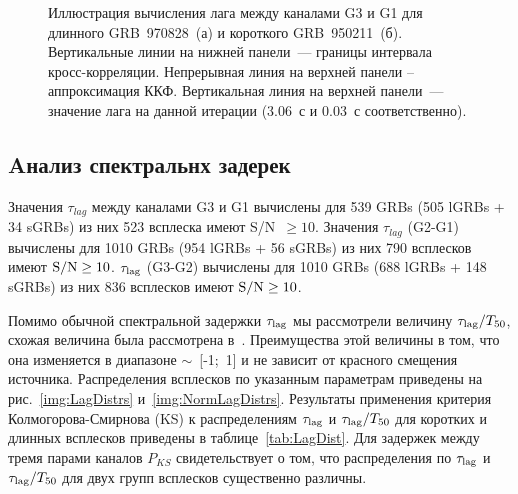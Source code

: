 \begin{figure}[h]
  \begin{minipage}[h]{0.5\textwidth}
  \end{minipage}
  \hfill
  \begin{minipage}[h]{0.5\textwidth}
  \end{minipage}
  \caption{Иллюстрация вычисления лага между каналами G3 и G1 для 
  длинного GRB~970828~(а) и короткого GRB~950211~(б). 
  Вертикальные линии на нижней панели~--- границы интервала кросс-корреляции. 
  Непрерывная линия на верхней панели -- аппроксимация ККФ. Вертикальная линия 
  на верхней панели~--- значение лага на данной итерации (3.06~с и 0.03~с соответственно).}
  \label{img:lagExample}  
\end{figure}

\subsection{Aнализ спектральнх задерек}
Значения $\tau_{lag}$ между каналами G3 и G1 вычислены для 539 GRBs (505 lGRBs + 34 sGRBs) 
из них 523 всплеска имеют S/N~$\ge 10$. Значения $\tau_{lag}$ (G2-G1) вычислены 
для 1010 GRBs (954 lGRBs  + 56 sGRBs) из них 790 всплесков имеют ${\mathrm{S/N}} \ge 10$. 
$\tau_{{\mathrm{lag}}}$ (G3-G2) вычислены для 1010 GRBs (688 lGRBs + 148 sGRBs) 
из них 836 всплесков имеют ${\mathrm{S/N}} \ge 10$.

Помимо обычной спектральной задержки $\tau_{{\mathrm{lag}}}$ мы рассмотрели величину 
$\tau_{{\mathrm{lag}}} / T_{50}$, схожая величина была рассмотрена в~\citep{Ripa_2012}. 
Преимущества этой величины в том, что она изменяется в диапазоне $\sim$~[-1;~1] и 
не зависит от красного смещения источника.  Распределения всплесков по указанным 
параметрам приведены на рис.~\ref{img:LagDistrs} и~\ref{img:NormLagDistrs}. 
Результаты применения критерия Колмогорова-Смирнова (KS) к распределениям 
$\tau_{{\mathrm{lag}}}$ и $\tau_{{\mathrm{lag}}} / T_{50}$ для коротких и длинных всплесков 
приведены в таблице~\ref{tab:LagDist}. Для задержек между тремя парами каналов 
$P_{KS}$ свидетельствует о том, что распределения по $\tau_{{\mathrm{lag}}}$ 
и $\tau_{{\mathrm{lag}}} / T_{50}$  для двух групп всплесков существенно различны. 

